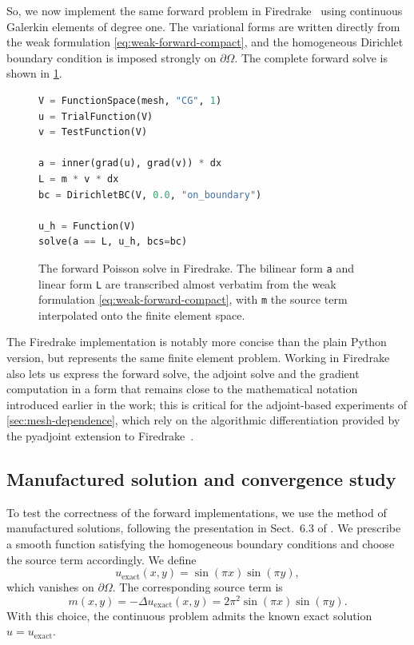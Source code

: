 \documentclass[a4paper,11pt]{article}
\newcommand{\dom}{\partial\Omega}
\theoremstyle{spacedplain} \newtheorem{theorem}[counter]{Theorem} \newtheorem{lemma}[counter]{Lemma} \newtheorem{prop}[counter]{Proposition} \newtheorem{cor}[counter]{Corollary}
\theoremstyle{spaceddefinition} \newtheorem{defn}[counter]{Definition} \newtheorem{example}[counter]{Example} \newtheorem{remark}[counter]{Remark}
\begin{document}
So, we now implement the same forward problem in Firedrake~\citep{firedrake2016} using continuous Galerkin elements of degree one. The variational forms are written directly from the weak formulation \cref{eq:weak-forward-compact}, and the homogeneous Dirichlet boundary condition is imposed strongly on $\dom$. The complete forward solve is shown in \cref{lst:poisson-firedrake}.

\begin{figure}[H]
\begin{lstlisting}[language=Python]
V = FunctionSpace(mesh, "CG", 1)
u = TrialFunction(V)
v = TestFunction(V)

a = inner(grad(u), grad(v)) * dx
L = m * v * dx
bc = DirichletBC(V, 0.0, "on_boundary")

u_h = Function(V)
solve(a == L, u_h, bcs=bc)
\end{lstlisting}
\caption{The forward Poisson solve in Firedrake. The bilinear form \texttt{a} and linear form \texttt{L} are transcribed almost verbatim from the weak formulation \cref{eq:weak-forward-compact}, with \texttt{m} the source term interpolated onto the finite element space.}
\label{lst:poisson-firedrake}
\end{figure}

The Firedrake implementation is notably more concise than the plain Python version, but represents the same finite element problem. Working in Firedrake also lets us express the forward solve, the adjoint solve and the gradient computation in a form that remains close to the mathematical notation introduced earlier in the work; this is critical for the adjoint-based experiments of \cref{sec:mesh-dependence}, which rely on the algorithmic differentiation provided by the pyadjoint extension to Firedrake~\citep{mitusch2019}.

\subsection{Manufactured solution and convergence study}
\label{sec:poisson-numerics:mms}

To test the correctness of the forward implementations, we use the method of manufactured solutions, following the presentation in Sect.~6.3 of \citet{hc2026}. We prescribe a smooth function satisfying the homogeneous boundary conditions and choose the source term accordingly. We define
\begin{equation}
  u_{\mathrm{exact}}(x, y) = \sin(\pi x) \sin(\pi y),
\end{equation}
which vanishes on $\dom$. The corresponding source term is
\begin{equation}
  m(x, y) = -\Delta u_{\mathrm{exact}}(x, y)
         = 2\pi^{2} \sin(\pi x) \sin(\pi y).
\end{equation}
With this choice, the continuous problem admits the known exact solution $u = u_{\mathrm{exact}}$.
\end{document}
